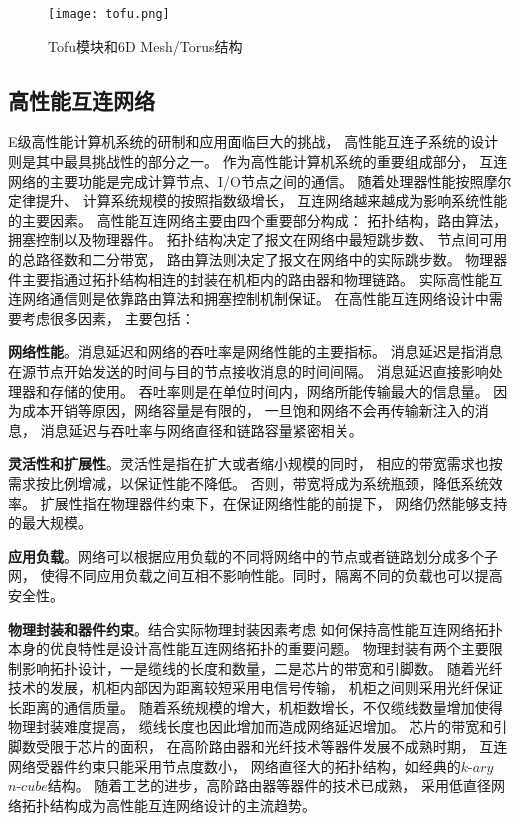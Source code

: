 \begin{figure}[htp]
\centering
\texttt{[image: tofu.png]}
\caption{Tofu模块和6D Mesh/Torus结构}
\label{tofuto}
\end{figure}

\subsection{高性能互连网络}

E级高性能计算机系统的研制和应用面临巨大的挑战，
高性能互连子系统的设计则是其中最具挑战性的部分之一。
作为高性能计算机系统的重要组成部分，
互连网络的主要功能是完成计算节点、I/O节点之间的通信。
随着处理器性能按照摩尔定律提升、
计算系统规模的按照指数级增长，
互连网络越来越成为影响系统性能的主要因素。
高性能互连网络主要由四个重要部分构成：
拓扑结构，路由算法，拥塞控制以及物理器件。
拓扑结构决定了报文在网络中最短跳步数、
节点间可用的总路径数和二分带宽，
路由算法则决定了报文在网络中的实际跳步数。
物理器件主要指通过拓扑结构相连的封装在机柜内的路由器和物理链路。
实际高性能互连网络通信则是依靠路由算法和拥塞控制机制保证。
在高性能互连网络设计中需要考虑很多因素，
主要包括：

\textbf{网络性能}。消息延迟和网络的吞吐率是网络性能的主要指标。
消息延迟是指消息在源节点开始发送的时间与目的节点接收消息的时间间隔。
消息延迟直接影响处理器和存储的使用。
吞吐率则是在单位时间内，网络所能传输最大的信息量。
因为成本开销等原因，网络容量是有限的，
一旦饱和网络不会再传输新注入的消息，
消息延迟与吞吐率与网络直径和链路容量紧密相关。

\textbf{灵活性和扩展性}。灵活性是指在扩大或者缩小规模的同时，
相应的带宽需求也按需求按比例增减，以保证性能不降低。
否则，带宽将成为系统瓶颈，降低系统效率。
扩展性指在物理器件约束下，在保证网络性能的前提下，
网络仍然能够支持的最大规模。

\textbf{应用负载}。网络可以根据应用负载的不同将网络中的节点或者链路划分成多个子网，
使得不同应用负载之间互相不影响性能。同时，隔离不同的负载也可以提高安全性。

\textbf{物理封装和器件约束}。结合实际物理封装因素考虑
如何保持高性能互连网络拓扑本身的优良特性是设计高性能互连网络拓扑的重要问题。
物理封装有两个主要限制影响拓扑设计，一是缆线的长度和数量，二是芯片的带宽和引脚数。
随着光纤技术的发展，机柜内部因为距离较短采用电信号传输，
机柜之间则采用光纤保证长距离的通信质量。
随着系统规模的增大，机柜数增长，不仅缆线数量增加使得物理封装难度提高，
缆线长度也因此增加而造成网络延迟增加。
芯片的带宽和引脚数受限于芯片的面积，
在高阶路由器和光纤技术等器件发展不成熟时期，
互连网络受器件约束只能采用节点度数小，
网络直径大的拓扑结构，如经典的$k\textrm{-}ary$ $n\textrm{-}cube$结构。
随着工艺的进步，高阶路由器等器件的技术已成熟，
采用低直径网络拓扑结构成为高性能互连网络设计的主流趋势。

